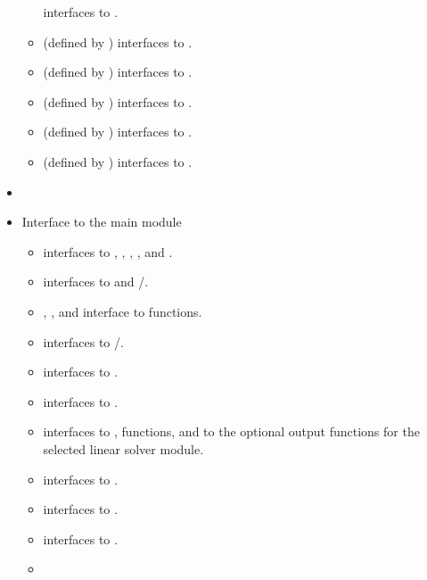 \begin{itemize}
\begin{itemize}
    interfaces to .
  \item {} (defined by {\sunlinsolspbcgs})
    interfaces to .
  \item {} (defined by {\sunlinsolspfgmr})
    interfaces to .
  \item {} (defined by {\sunlinsolspgmr})
    interfaces to .
  \item {} (defined by {\sunlinsolsptfqmr})
    interfaces to .
  \item {} (defined by {\sunlinsolslumt})
    interfaces to .
  \end{itemize}
\item
\item Interface to the main {\ida} module
  \begin{itemize}
  \item {}
    interfaces to , , ,
    , and .
  \item {}
    interfaces to  and /.
  \item {}, , and 
    interface to  functions.
  \item {}
    interfaces to /.
  \item {}
    interfaces to .
  \item {}
    interfaces to .
  \item {}
    interfaces to ,  functions, and to the optional
    output functions for the selected linear solver module.
  \item {}
    interfaces to .
  \item {}
    interfaces to .
  \item {}
    interfaces to .
  \item {}

\end{itemize}
\end{itemize}
